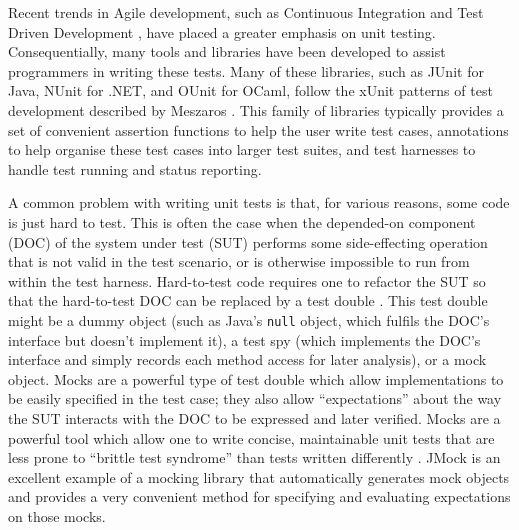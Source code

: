 \documentclass[proposal]{softeng}
\begin{document}

Recent trends in Agile development, such as Continuous Integration
\cite{humble:continuous} and Test Driven Development \cite{beck:tdd},
have placed a greater emphasis on unit testing. Consequentially, many
tools and libraries have been developed to assist programmers in
writing these tests. Many of these libraries, such as JUnit
\cite{www:junit} for Java, NUnit \cite{www:nunit} for .NET, and OUnit
\cite{www:ounit} for OCaml, follow the xUnit patterns of test
development described by Meszaros \cite{meszaros:xunit}. This family
of libraries typically provides a set of convenient assertion
functions to help the user write test cases, annotations to help
organise these test cases into larger test suites, and test harnesses
to handle test running and status reporting.

A common problem with writing unit tests is that, for various reasons,
some code is just hard to test. This is often the case when the
depended-on component (DOC) of the system under test (SUT) performs
some side-effecting operation that is not valid in the test scenario,
or is otherwise impossible to run from within the test
harness. Hard-to-test code requires one to refactor the SUT so that
the hard-to-test DOC can be replaced by a test double
\cite{meszaros:xunit}. This test double might be a dummy object (such
as Java's \verb|null| object, which fulfils the DOC's interface but
doesn't implement it), a test spy (which implements the DOC's
interface and simply records each method access for later analysis),
or a mock object. Mocks are a powerful type of test double which allow
implementations to be easily specified in the test case; they also
allow ``expectations'' about the way the SUT interacts with the DOC to
be expressed and later verified. Mocks are a powerful tool which allow
one to write concise, maintainable unit tests that are less prone to
``brittle test syndrome'' than tests written differently
\cite{meszaros:xunit}. JMock \cite{www:jmock} is an excellent example
of a mocking library that automatically generates mock objects and
provides a very convenient method for specifying and evaluating
expectations on those mocks.
\end{document}
